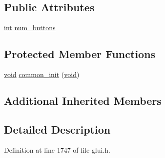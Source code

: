 \subsection*{Public Attributes}
\begin{DoxyCompactItemize}
\item 
\hyperlink{wglext_8h_a500a82aecba06f4550f6849b8099ca21}{int} \hyperlink{class_g_l_u_i___radio_group_a392b3c55c3951005a573491e5b555f35}{num\+\_\+buttons}
\end{DoxyCompactItemize}
\subsection*{Protected Member Functions}
\begin{DoxyCompactItemize}
\item 
\hyperlink{wglext_8h_a9e6b7f1933461ef318bb000d6bd13b83}{void} \hyperlink{class_g_l_u_i___radio_group_ad10760662aad89d1ee4868abbe5c94e1}{common\+\_\+init} (\hyperlink{wglext_8h_a9e6b7f1933461ef318bb000d6bd13b83}{void})
\end{DoxyCompactItemize}
\subsection*{Additional Inherited Members}


\subsection{Detailed Description}


Definition at line 1747 of file glui.\+h.



